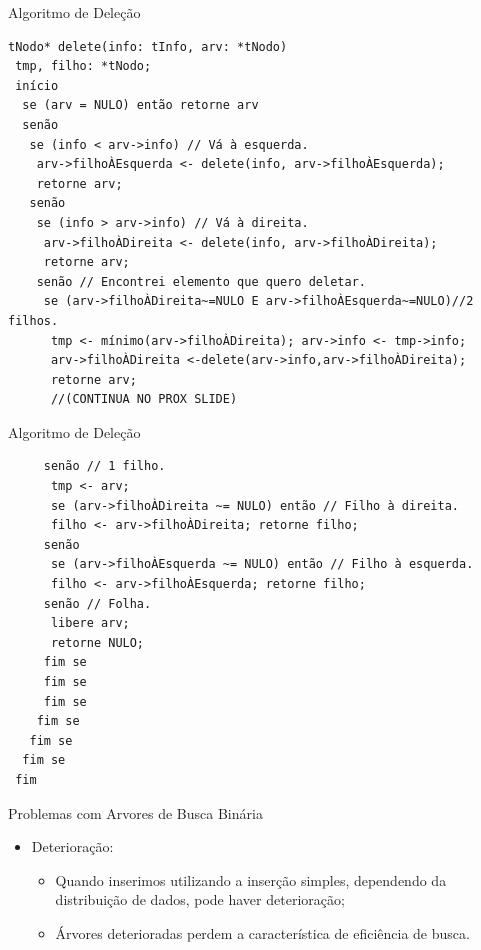 \documentclass[12pt,table,xcolor={dvipsnames}]{beamer}
\begin{document}
\begin{frame}[fragile]{Algoritmo de Deleção}
          \begin{lstlisting}
tNodo* delete(info: tInfo, arv: *tNodo)
 tmp, filho: *tNodo;
 início
  se (arv = NULO) então retorne arv
  senão
   se (info < arv->info) // Vá à esquerda.
    arv->filhoÀEsquerda <- delete(info, arv->filhoÀEsquerda);
    retorne arv;
   senão
    se (info > arv->info) // Vá à direita.
     arv->filhoÀDireita <- delete(info, arv->filhoÀDireita);
     retorne arv;
    senão // Encontrei elemento que quero deletar.
     se (arv->filhoÀDireita~=NULO E arv->filhoÀEsquerda~=NULO)//2 filhos.
      tmp <- mínimo(arv->filhoÀDireita); arv->info <- tmp->info;
      arv->filhoÀDireita <-delete(arv->info,arv->filhoÀDireita);
      retorne arv;
      //(CONTINUA NO PROX SLIDE)
		  \end{lstlisting}
\end{frame} 

\begin{frame}[fragile]{Algoritmo de Deleção}
          \begin{lstlisting}
     senão // 1 filho.
      tmp <- arv;
      se (arv->filhoÀDireita ~= NULO) então // Filho à direita.
      filho <- arv->filhoÀDireita; retorne filho;
     senão
      se (arv->filhoÀEsquerda ~= NULO) então // Filho à esquerda.
      filho <- arv->filhoÀEsquerda; retorne filho;
     senão // Folha.
      libere arv;
      retorne NULO;
     fim se 
     fim se
     fim se
    fim se 
   fim se
  fim se
 fim
		  \end{lstlisting}
\end{frame} 

\begin{frame}[fragile]{Problemas com Arvores de Busca Binária}
          \begin{itemize}
          \item Deterioração:
		  \begin{itemize}
		  \item Quando inserimos utilizando a inserção simples, dependendo da distribuição de dados, pode haver deterioração;
		  \item Árvores deterioradas perdem a característica de eficiência de busca.
		  \end{itemize}
       	  \end{itemize}
\end{frame}
\end{document}
